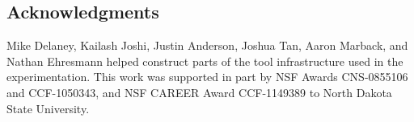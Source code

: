 
\subsection*{Acknowledgments}

Mike Delaney, Kailash Joshi, Justin Anderson, Joshua Tan, Aaron 
Marback, and Nathan Ehresmann helped construct parts of the tool 
infrastructure used in the experimentation. This work was 
supported in part by NSF Awards CNS-0855106 and CCF-1050343, 
and NSF CAREER Award CCF-1149389 to North Dakota State University.

